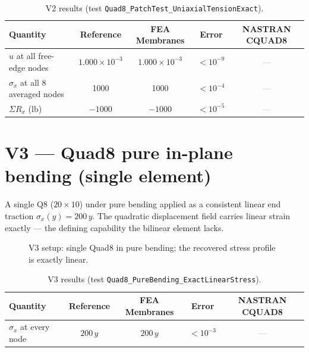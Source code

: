 \documentclass[11pt,a4paper]{report}
\newcommand{\wall}[3]{%
  \draw[thick] (#1,#2) -- (#1,#3);
  \fill[pattern=north east lines] (#1-0.18,#2) rectangle (#1,#3);
}
\newcommand{\nast}{\textcolor{gray}{---}} %
\begin{document}
\begin{table}[H]\centering\small
\begin{tabular}{@{}lcccc@{}}
\toprule
Quantity & Reference & FEA Membranes & Error & NASTRAN CQUAD8 \\
\midrule
$u$ at all free-edge nodes & $1.000\times10^{-3}$ & $1.000\times10^{-3}$ & $<10^{-9}$ & \nast \\
$\sigma_x$ at all 8 averaged nodes & 1000 & 1000 & $<10^{-4}$ & \nast \\
$\Sigma R_x$ (lb) & $-1000$ & $-1000$ & $<10^{-5}$ & \nast \\
\bottomrule
\end{tabular}
\caption{V2 results (test \texttt{Quad8\_PatchTest\_UniaxialTensionExact}).}
\end{table}

\section{V3 --- Quad8 pure in-plane bending (single element)}
A single Q8 ($20\times10$) under pure bending applied as a consistent linear
end traction $\sigma_x(y)=200\,y$. The quadratic displacement field carries
linear strain exactly --- the defining capability the bilinear element lacks.

\begin{figure}[H]\centering
{}
\caption{V3 setup: single Quad8 in pure bending; the recovered stress profile
is exactly linear.}
\end{figure}

\begin{table}[H]\centering\small
\begin{tabular}{@{}lcccc@{}}
\toprule
Quantity & Reference & FEA Membranes & Error & NASTRAN CQUAD8 \\
\midrule
$\sigma_x$ at every node & $200\,y$ & $200\,y$ & $<10^{-3}$ & \nast \\
\bottomrule
\end{tabular}
\caption{V3 results (test \texttt{Quad8\_PureBending\_ExactLinearStress}).}
\end{table}
\end{document}
